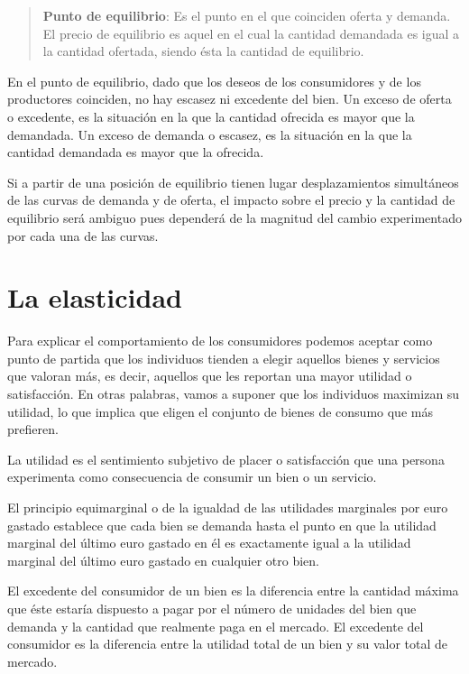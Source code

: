 \documentclass[
]{book}
\begin{document}
\begin{quote}
\textbf{Punto de equilibrio}:
Es el punto en el que coinciden oferta y demanda. El precio de equilibrio es aquel en el cual la cantidad demandada es igual a la cantidad ofertada, siendo ésta la cantidad de equilibrio.
\end{quote}

En el punto de equilibrio, dado que los deseos de los consumidores y de los productores coinciden, no hay escasez ni excedente del bien.
Un exceso de oferta o excedente, es la situación en la que la cantidad ofrecida es mayor que la demandada.
Un exceso de demanda o escasez, es la situación en la que la cantidad demandada es mayor que la ofrecida.

Si a partir de una posición de equilibrio tienen lugar desplazamientos simultáneos de las curvas de demanda y de oferta, el impacto sobre el precio y la cantidad de equilibrio será ambiguo pues dependerá de la magnitud del cambio experimentado por cada una de las curvas.

\hypertarget{la-elasticidad}{%
\chapter{La elasticidad}\label{la-elasticidad}}

Para explicar el comportamiento de los consumidores podemos aceptar como punto de partida que los individuos tienden a elegir aquellos bienes y servicios que valoran más, es decir, aquellos que les reportan una mayor utilidad o satisfacción. En otras palabras, vamos a suponer que los individuos maximizan su utilidad, lo que implica que eligen el conjunto de bienes de consumo que más prefieren.

La utilidad es el sentimiento subjetivo de placer o satisfacción que una persona experimenta como consecuencia de consumir un bien o un servicio.

El principio equimarginal o de la igualdad de las utilidades marginales por euro gastado establece que cada bien se demanda hasta el punto en que la utilidad marginal del último euro gastado en él es exactamente igual a la utilidad marginal del último euro gastado en cualquier otro bien.

El excedente del consumidor de un bien es la diferencia entre la cantidad máxima que éste estaría dispuesto a pagar por el número de unidades del bien que demanda y la cantidad que realmente paga en el mercado. El excedente del consumidor es la diferencia entre la utilidad total de un bien y su valor total de mercado.
\end{document}
